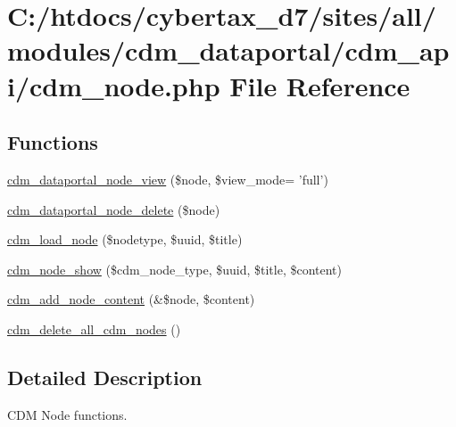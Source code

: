 \hypertarget{cdm__node_8php}{\section{C\-:/htdocs/cybertax\-\_\-d7/sites/all/modules/cdm\-\_\-dataportal/cdm\-\_\-api/cdm\-\_\-node.php File Reference}
\label{cdm__node_8php}
}
\subsection*{Functions}
\begin{DoxyCompactItemize}
\item 
\hyperlink{cdm__node_8php_a3550e8f7ee7966b1b8f94ca295a11a57}{cdm\-\_\-dataportal\-\_\-node\-\_\-view} (\$node, \$view\-\_\-mode= 'full')
\item 
\hyperlink{cdm__node_8php_a2633ff85c9024bc1cd766b5f562087fc}{cdm\-\_\-dataportal\-\_\-node\-\_\-delete} (\$node)
\item 
\hyperlink{cdm__node_8php_a5eac01000515258d886409a2af5cd31f}{cdm\-\_\-load\-\_\-node} (\$nodetype, \$uuid, \$title)
\item 
\hyperlink{cdm__node_8php_a754dd1fc2dfc0085b5cce7cdf1164ba1}{cdm\-\_\-node\-\_\-show} (\$cdm\-\_\-node\-\_\-type, \$uuid, \$title, \$content)
\item 
\hyperlink{cdm__node_8php_af818d37c69b2409883a0ea8287e2fa21}{cdm\-\_\-add\-\_\-node\-\_\-content} (\&\$node, \$content)
\item 
\hyperlink{cdm__node_8php_aaad3712918311899b66191b975c0320b}{cdm\-\_\-delete\-\_\-all\-\_\-cdm\-\_\-nodes} ()
\end{DoxyCompactItemize}


\subsection{Detailed Description}
C\-D\-M Node functions. 

